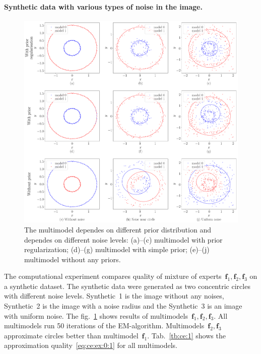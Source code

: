 \documentclass[12pt, twoside]{article}
\numberwithin{equation}{section}
\begin{document}
\paragraph{Synthetic data with various types of noise in the image.}
\begin{figure}[h!t]\center
\includegraphics[width=1\textwidth]{result_eng/experiment_synthetic}
\caption{The multimodel dependes on different prior distribution and dependes on different noise levels: (a)--(c) multimodel with prior regularization; (d)--(g) multimodel with simple prior; (e)--(j) multimodel without any priors.}
\label{experiment:1}
\end{figure}
The computational experiment compares quality of mixture of experts~$\textbf{f}_1, \textbf{f}_2, \textbf{f}_3$ on a synthetic dataset.
The synthetic data were generated as two concentric circles with different noise levels.
Synthetic~1 is the image without any noises, Synthetic~2 is the image with a noise radius and the Synthetic~3 is an image with uniform noise.
The fig.~\ref{experiment:1} shows results of multimodels~$\textbf{f}_1, \textbf{f}_2, \textbf{f}_3$.
All multimodels run 50 iterations of the EM-algorithm.
Multimodels~$\textbf{f}_2, \textbf{f}_3$ approximate circles better than multimodel~$\textbf{f}_1$. Tab.~\ref{tb:ce:1} shows the approximation quality~\eqref{eq:ce:ex:0:1} for all multimodels.
\end{document}
